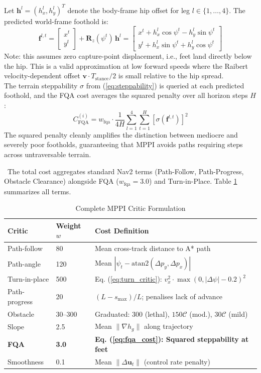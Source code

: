 \documentclass[letterpaper, 10 pt, conference]{ieeeconf}  %
\begin{document}
\begin{itemize}
    Let $\mathbf{h}^l = (h_x^l, h_y^l)^T$ denote the body-frame hip offset for leg $l \in \{1,\dots,4\}$. The predicted world-frame foothold is:
    \begin{equation}
    \mathbf{f}^{l,t} = \begin{bmatrix} x^t \\ y^t \end{bmatrix} + \mathbf{R}_z(\psi^t)\,\mathbf{h}^l = \begin{bmatrix} x^t + h_x^l \cos\psi^t - h_y^l \sin\psi^t \\ y^t + h_x^l \sin\psi^t + h_y^l \cos\psi^t \end{bmatrix} \label{eq:foot_predict}
    \end{equation}
    Note: this assumes zero capture-point displacement, i.e., feet land directly below the hip. This is a valid approximation at low forward speeds where the Raibert velocity-dependent offset $\mathbf{v} \cdot T_{\text{stance}}/2$ is small relative to the hip spread. \\
    The terrain steppability $\sigma$ from (\ref{eq:steppability}) is queried at each predicted foothold, and the FQA cost averages the squared penalty over all horizon steps $H$:
    \begin{equation}
    C_{\text{FQA}}^{(i)} = w_{\text{fqa}} \cdot \frac{1}{4H}\sum_{l=1}^{4}\sum_{t=1}^{H} \left[\sigma\!\left(\mathbf{f}^{l,t}\right)\right]^2 \label{eq:fqa_cost}
    \end{equation}
    The squared penalty cleanly amplifies the distinction between mediocre and severely poor footholds, guaranteeing that MPPI avoids paths requiring steps across untraversable terrain.
\end{itemize}
\
The total cost aggregates standard Nav2 terms (Path-Follow, Path-Progress, Obstacle Clearance) alongside FQA ($w_{\text{fqa}} = 3.0$) and Turn-in-Place. Table \ref{tab:critics} summarizes all terms.
\begin{table}[ht]
\centering
\caption{Complete MPPI Critic Formulation}
\label{tab:critics}
\begin{tabular}{|p{1.25cm}|p{0.75cm}|p{5.05cm}|}
\hline
\textbf{Critic} & \textbf{Weight $w$} & \textbf{Cost Definition} \\
\hline
Path-follow & 80 & Mean cross-track distance to A* path \\
Path-angle & 120 & Mean $|\psi_t - \text{atan2}(\Delta p_y, \Delta p_x)|$ \\
Turn-in-place & 500 & Eq. (\ref{eq:turn_critic}): $v_x^2 \cdot \max(0, |\Delta\psi| - 0.2)^2$ \\
Path-progress & 20 & $(L - s_{\max})/L$; penalises lack of advance \\
Obstacle & 30--300 & Graduated: 300 (lethal), $150\mathcal{C}$ (mod.), $30\mathcal{C}$ (mild) \\
Slope & 2.5 & Mean $\|\nabla h_g\|$ along trajectory \\
\textbf{FQA} & \textbf{3.0} & \textbf{Eq. (\ref{eq:fqa_cost}): Squared steppability at feet} \\
Smoothness & 0.1 & Mean $\|\Delta \mathbf{u}_t\|$ (control rate penalty) \\
\hline
\end{tabular}
\end{table}
\end{document}
